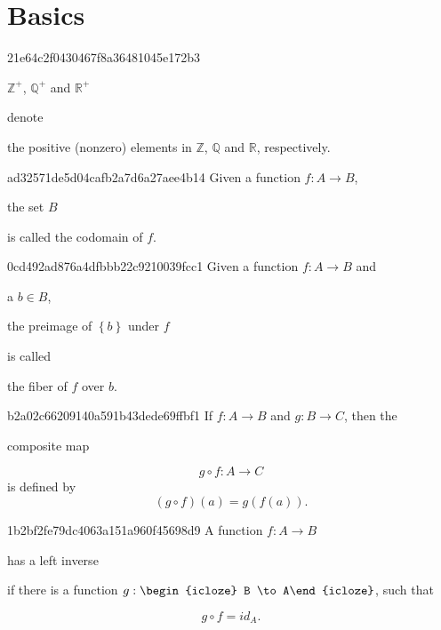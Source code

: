 


\section{Basics}
\begin{note}{21e64c2f0430467f8a36481045e172b3}
    \begin{icloze}{2}\({ \mathbb Z^{+} }\), \({ \mathbb Q^{+} }\) and \({ \mathbb R^{+} }\)\end{icloze} denote \begin{icloze}{1}the positive (nonzero) elements in \({ \mathbb Z }\), \({ \mathbb Q }\) and \({ \mathbb R }\), respectively.\end{icloze}
\end{note}

\begin{note}{ad32571de5d04cafb2a7d6a27aee4b14}
    Given a function \({ f : A \to B }\), \begin{icloze}{1}the set \({ B }\)\end{icloze} is called the codomain of \({ f }\).
\end{note}

\begin{note}{0cd492ad876a4dfbbb22c9210039fcc1}
    Given a function \({ f : A \to B }\) and \begin{icloze}{3}a \({ b \in B }\),\end{icloze} \begin{icloze}{2}the preimage of \({ \left\{ b \right\} }\) under \({ f }\)\end{icloze} is called \begin{icloze}{1}the fiber of \({ f }\) over \({ b }\).\end{icloze}
\end{note}

\begin{note}{b2a02c66209140a591b43dede69ffbf1}
    If \({ f : A \to B }\) and \({ g : B \to C }\), then the \begin{icloze}{1}composite map\end{icloze}
    \[
        g \circ f : A \to C
    \]
    is defined by
    \[
        (g \circ f)(a) = g(f(a)).
    \]
\end{note}

\begin{note}{1b2bf2fe79dc4063a151a960f45698d9}
    A function \({ f : A \to B }\) \begin{icloze}{3}has a left inverse\end{icloze} if there is a function \({ g : \begin{icloze}{2}B \to A\end{icloze} }\), such that
    \begin{icloze}{1}
        \[
            g \circ f = id_A.
        \]
    \end{icloze}
\end{note}

